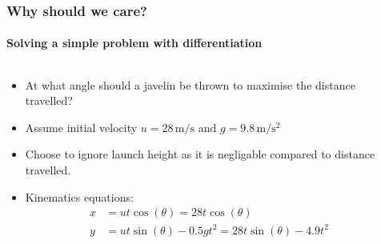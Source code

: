 \documentclass[]{article}
\begin{document}
\begin{frame}
\frametitle{Why should we care?}
\framesubtitle{Solving a simple problem with differentiation}

\begin{columns}
\begin{column}{0.65\textwidth}
	\begin{itemize}
		\item<1-> At what angle should a javelin be thrown to maximise the distance travelled?
		\item<2-> Assume initial velocity $u=28\,\si{\meter\per\second}$ and $g=9.8\,\si{\meter\per\second\squared}$
		\item<2-> Choose to ignore launch height as it is negligable compared to distance travelled.
		\item<3-> Kinematics equations:
		\begin{align*}
			x &= u t \cos(\theta) = 28 t \cos(\theta)\\
			y &= u t \sin(\theta) - 0.5 g t^2 = 28 t \sin(\theta) - 4.9 t^2
		\end{align*}
	\end{itemize}
\end{column}
\begin{column}{0.35\textwidth}
\end{column}
\end{columns}
\end{frame}
\end{document}
